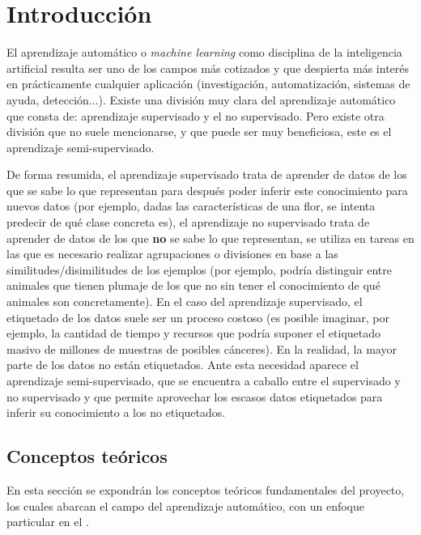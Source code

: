 
\cleardoublepage

\chapter{Introducción}
\label{introduccion}

El aprendizaje automático o \textit{machine learning} como disciplina de la inteligencia artificial resulta ser uno de los campos más cotizados y que despierta más interés en prácticamente cualquier aplicación (investigación, automatización, sistemas de ayuda, detección...). Existe una división muy clara del aprendizaje automático que consta de: aprendizaje supervisado y el no supervisado. Pero existe otra división que no suele mencionarse, y que puede ser muy beneficiosa, este es el aprendizaje semi-supervisado.

De forma resumida, el aprendizaje supervisado trata de aprender de datos de los que se sabe lo que representan para después poder inferir este conocimiento para nuevos datos (por ejemplo, dadas las características de una flor, se intenta predecir de qué clase concreta es), el aprendizaje no supervisado trata de aprender de datos de los que \textbf{no} se sabe lo que representan, se utiliza en tareas en las que es necesario realizar agrupaciones o divisiones en base a las similitudes/disimilitudes de los ejemplos (por ejemplo, podría distinguir entre animales que tienen plumaje de los que no sin tener el conocimiento de qué animales son concretamente). En el caso del aprendizaje supervisado, el etiquetado de los datos suele ser un proceso costoso (es posible imaginar, por ejemplo, la cantidad de tiempo y recursos que podría suponer el etiquetado masivo de millones de muestras de posibles cánceres). En la realidad, la mayor parte de los datos no están etiquetados. Ante esta necesidad aparece el aprendizaje semi-supervisado, que se encuentra a caballo entre el supervisado y no supervisado y que permite aprovechar los escasos datos etiquetados para inferir su conocimiento a los no etiquetados.


\section{Conceptos teóricos}
\label{conceptos-teoricos}

En esta sección se expondrán los conceptos teóricos fundamentales del proyecto, los cuales abarcan el campo del aprendizaje automático, con un enfoque particular en el .

